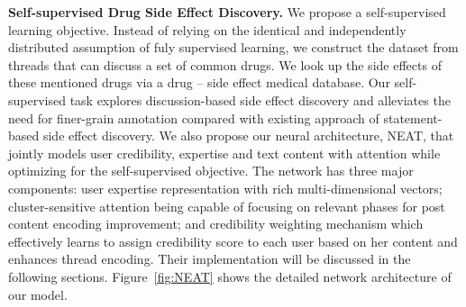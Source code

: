 \documentclass{bmcart}
\begin{document}



{\bf Self-supervised Drug Side Effect Discovery.} We propose a self-supervised learning objective. Instead of relying on the identical and independently distributed assumption of fuly supervised learning, we construct the dataset from threads that can discuss a set of common drugs. We look up the side effects of these mentioned drugs via a drug -- side effect medical database. Our self-supervised task explores discussion-based side effect discovery and alleviates the need for finer-grain annotation compared with existing approach of statement-based side effect discovery.
We also propose our neural architecture, NEAT, that jointly models user credibility, expertise and text content with attention while optimizing for the self-supervised objective.
The network has three major components: user expertise representation with rich multi-dimensional vectors; cluster-sensitive attention being capable of focusing on relevant phases for post content encoding improvement; and credibility weighting mechanism which effectively learns to assign credibility score to each user based on her content and enhances thread encoding. Their implementation will be discussed in the following sections. Figure~\ref{fig:NEAT} shows the detailed network architecture of our model. \\
\end{document}
